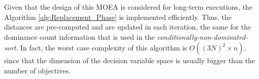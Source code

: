 Given that the design of this MOEA is considered for long-term executions, the Algorithm \ref{alg:Replacement_Phase} is implemented efficiently.
%
Thus, the distances are pre-computed and are updated in each iteration, the same for the dominance count information that is used in the \textit{conditionally-non-dominated-sort}.
%
In fact, the worst case complexity of this algorithm is $O((3 N)^2 \times n)$, since that the dimension of the decision variable space is usually bigger than the number of objectives. 

